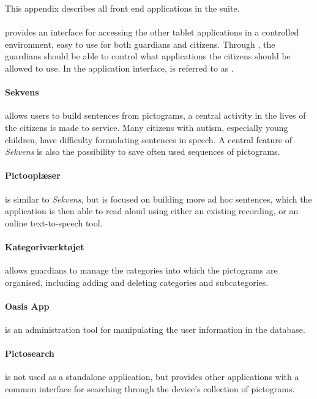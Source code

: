 This appendix describes all front end applications in the \giraf suite.

\paragraph{\launcher} provides an interface for accessing the other tablet applications in a controlled environment, easy to use for both guardians and citizens. 
Through \launcher, the guardians should be able to control what applications the citizens should be allowed to use. In the application interface, \launcher is referred to as \giraf.

\paragraph{Sekvens} allows users to build sentences from pictograms, a central activity in the lives of the citizens \giraf is made to service. Many citizens with autism, especially young children, have difficulty formulating sentences in speech. A central feature of \textit{Sekvens} is also the possibility to save often used sequences of pictograms.

\paragraph{Pictooplæser} is similar to \textit{Sekvens}, but is focused on building more ad hoc sentences, which the application is then able to read aloud using either an existing recording, or an online text-to-speech tool. 

\paragraph{Kategoriværktøjet} allows guardians to manage the categories into which the pictograms are organised, including adding and deleting categories and subcategories.

\paragraph{Oasis App} is an administration tool for manipulating the user information in the database. 

\paragraph{Pictosearch} is not used as a standalone application, but provides other applications with a common interface for searching through the device's collection of pictograms.


